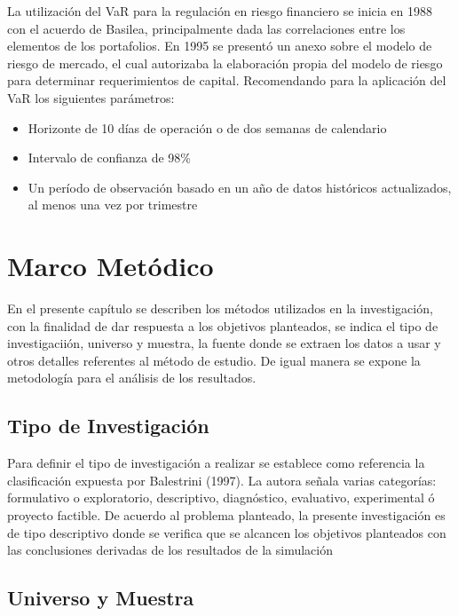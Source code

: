 \documentclass[a4paper,12pt]{Latex/Classes/PhDthesisPSnPDF}
\begin{document}
La utilización del VaR para la regulación en riesgo financiero se inicia en 1988 con el acuerdo de Basilea, principalmente dada las correlaciones entre los elementos de los portafolios. En 1995 se presentó un anexo sobre el modelo de riesgo de mercado, el cual autorizaba la elaboración propia del modelo de riesgo para determinar requerimientos de capital. Recomendando para la aplicación del VaR los siguientes parámetros:

\begin{itemize}
\item Horizonte de 10 días de operación o de dos semanas de calendario
\item Intervalo de confianza de 98\%
\item Un período de observación basado en un año de datos históricos actualizados, al menos una vez por trimestre
\end{itemize}

\chapter{Marco Metódico}

En el presente capítulo se describen los métodos utilizados en la investigación, con la finalidad de dar respuesta a los objetivos planteados, se indica el tipo de investigaciión, universo y muestra, la fuente donde se extraen los datos a usar y otros detalles referentes al método de estudio. De igual manera se expone la metodología para el análisis de los resultados.

\section{Tipo de Investigación}

Para definir el tipo de investigación a realizar se establece como referencia la clasificación expuesta por Balestrini (1997). La autora señala varias categorías: formulativo o exploratorio, descriptivo, diagnóstico, evaluativo, experimental ó proyecto factible. De acuerdo al problema planteado, la presente investigación es de tipo descriptivo donde se verifica que se alcancen los objetivos planteados con las conclusiones derivadas de los resultados de la simulación

\section{Universo y Muestra}
\end{document}
